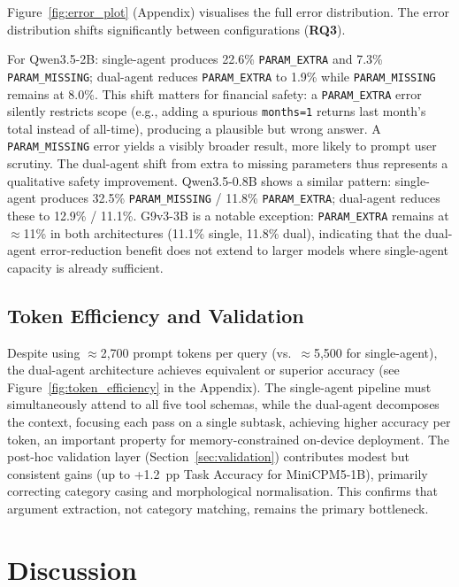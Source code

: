 \documentclass[11pt,twocolumn]{article}
\begin{document}
Figure~\ref{fig:error_plot} (Appendix) visualises the full error distribution.
The error distribution shifts significantly between configurations
(\textbf{RQ3}).

For Qwen3.5-2B: single-agent produces 22.6\% \texttt{PARAM\_EXTRA}
and 7.3\% \texttt{PARAM\_MISSING}; dual-agent reduces
\texttt{PARAM\_EXTRA} to 1.9\% while \texttt{PARAM\_MISSING} remains
at 8.0\%.
This shift matters for financial safety:
a \texttt{PARAM\_EXTRA} error silently restricts scope (e.g., adding
a spurious \texttt{months=1} returns last month's total instead of
all-time), producing a plausible but wrong answer.
A \texttt{PARAM\_MISSING} error yields a visibly broader result,
more likely to prompt user scrutiny.
The dual-agent shift from extra to missing parameters thus
represents a qualitative safety improvement.
Qwen3.5-0.8B shows a similar pattern: single-agent produces
32.5\% \texttt{PARAM\_MISSING} / 11.8\% \texttt{PARAM\_EXTRA};
dual-agent reduces these to 12.9\% / 11.1\%.
G9v3-3B is a notable exception: \texttt{PARAM\_EXTRA} remains
at $\approx$11\% in both architectures (11.1\% single, 11.8\%
dual), indicating that the dual-agent error-reduction benefit
does not extend to larger models where single-agent capacity is
already sufficient.

\subsection{Token Efficiency and Validation}

Despite using $\approx$2,700 prompt tokens per query (vs.\
$\approx$5,500 for single-agent), the dual-agent architecture
achieves equivalent or superior accuracy
(see Figure~\ref{fig:token_efficiency} in the Appendix).
The single-agent pipeline must simultaneously attend to all five
tool schemas, while the dual-agent decomposes the context, focusing
each pass on a single subtask, achieving higher accuracy per
token, an important property for memory-constrained on-device
deployment.
The post-hoc validation layer (Section~\ref{sec:validation})
contributes modest but consistent gains (up to +1.2~pp Task
Accuracy for MiniCPM5-1B), primarily correcting category casing and
morphological normalisation.
This confirms that argument extraction, not category matching,
remains the primary bottleneck.

\section{Discussion}
\label{sec:discussion}
\end{document}
